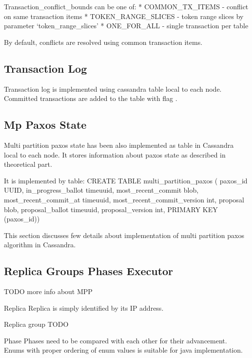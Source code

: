 Transaction_conflict_bounds can be one of:
* COMMON_TX_ITEMS - conflict on same transaction items
* TOKEN_RANGE_SLICES - token range slices by parameter ‘token_range_slices’
* ONE_FOR_ALL - single transaction per table


By default, conflicts are resolved using common transaction items.


\subsection{Transaction Log}
Transaction log is implemented using cassandra table local to each node. 
Committed transactions are added to the table with flag . 


\subsection{Mp Paxos State}
Multi partition paxos state has been also implemented as table in Cassandra local to each node. It stores information about paxos state as described in theoretical part.


It is implemented by table:
CREATE TABLE multi_partition_paxos (
paxos_id UUID,
in_progress_ballot timeuuid,
most_recent_commit blob,
most_recent_commit_at timeuuid,
most_recent_commit_version int,
proposal blob,
proposal_ballot timeuuid,
proposal_version int,
PRIMARY KEY (paxos_id))




This section discusses few details about implementation of multi partition paxos algorithm in Cassandra.

\subsection{Replica Groups Phases Executor}

TODO more info about MPP


Replica
Replica is simply identified by its IP address. 


Replica group
TODO


Phase
Phases need to be compared with each other for their advancement. Enums with proper ordering of enum values is suitable for java implementation.


